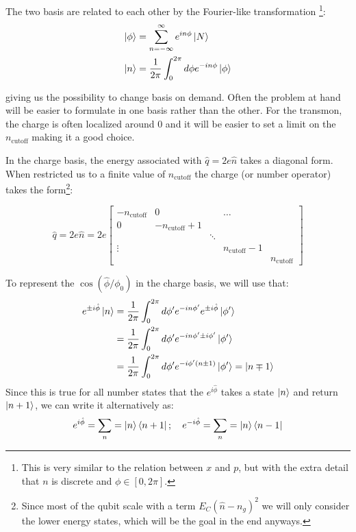 The two basis are related to each other by the Fourier-like transformation \cite{langford} \footnote{This is very similar to the relation between $x$ and $p$, but with the extra detail that $n$ is discrete and $\phi\in[0, 2\pi]$.}:
\begin{align}
    \ket{\phi} &= \sum_{n=-\infty}^\infty e^{in\phi}\ket{N} \\
    \ket{n} &= \frac{1}{2\pi} \int_0^{2\pi}d\phi e^{-in\phi}\ket{\phi}
\end{align}

giving us the possibility to change basis on demand. Often the problem at hand will be easier to formulate in one basis rather than the other. For the transmon, the charge is often localized around 0 and it will be easier to set a limit on the $n_{\text{cutoff}}$ making it a good choice. 

In the charge basis, the energy associated with $\hat{q} = 2e\hat{n}$ takes a diagonal form. When restricted us to a finite value of $n_{\text{cutoff}}$ the charge (or number operator) takes the form\footnote{Since most of the qubit scale with a term $E_C(\hat{n} - n_g)^2$ we will only consider the lower energy states, which will be the goal in the end anyways.}:

\begin{equation}
    \hat{q} =  2 e \hat{n} = 2 e \begin{bmatrix}
-n_{\text{cutoff}} & 0 &  & \ldots &  \\
0 & -n_{\text{cutoff}}+1 &  &  &  \\
 &  & \ddots &  &  \\
\vdots &  &  & n_{\text{cutoff}}-1 &  \\
 &  &  &  & n_{\text{cutoff}} 
\end{bmatrix}
\end{equation} 

To represent the $\cos(\hat{\phi} / \phi_0)$ in the charge basis, we will use that:
\begin{align*}
    e^{\pm i \hat{\phi}}\ket{n} &= \frac{1}{2\pi} \int_0^{2\pi} d \phi' e^{-in\phi'} e^{\pm i \hat{\phi}}\ket{\phi'} \\
                                &=  \frac{1}{2\pi} \int_0^{2\pi} d \phi' e^{-in\phi'\pm i \phi'} \ket{\phi'} \\
                                &=  \frac{1}{2\pi} \int_0^{2\pi} d \phi' e^{-i\phi'(n\pm 1)} \ket{\phi'} = \ket{n\mp 1}\\                                
\end{align*}
Since this is true for all number states that the $e^{i\hat{\phi}}$ takes a state $\ket{n}$ and return $\ket{n+1}$, we can write it alternatively as:
\begin{equation}
    e^{i\hat{\phi}} = \sum_n = \ket{n}\bra{n+1}; \quad e^{-i\hat{\phi}} = \sum_n = \ket{n}\bra{n-1}
\end{equation}

